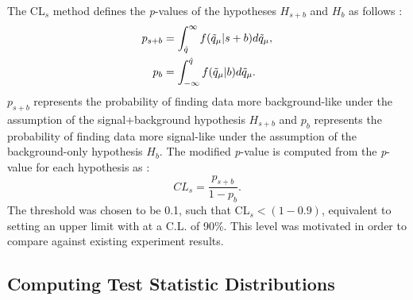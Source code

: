 The CL$_{s}$ method defines the \textit{p}-values of the hypotheses $H_{s+b}$ and $H_b$ as follows \cite{asymptotic_test, CLs_Junk, CLs_Read}:
\begin{align}
\label{eq:psb}
    p_{s+b} & = \int_{\hat{q}}^{\infty} f(\Tilde{q}_\mu|s+b) d\Tilde{q}_\mu, \\
\label{eq:pb}
    p_{b} & = \int^{\hat{q}}_{-\infty} f(\Tilde{q}_\mu|b) d\Tilde{q}_\mu.
\end{align}
$p_{s+b}$ represents the probability of finding data more background-like under the assumption of the signal+background hypothesis $H_{s+b}$ and $p_b$ represents the probability of finding data more signal-like under the assumption of the background-only hypothesis $H_b$.
The modified \textit{p}-value is computed from the \textit{p}-value for each hypothesis as \cite{asymptotic_test, CLs_Junk, CLs_Read}:
\begin{equation}
\label{eq:cls}
    CL_{s} = \frac{p_{s+b}}{1-p_b}.
\end{equation}
The threshold was chosen to be 0.1, such that CL$_{s} < (1 - 0.9)$, equivalent to setting an upper limit with at a C.L. of 90\%.
This level was motivated in order to compare against existing experiment results. 

\subsection{Computing Test Statistic Distributions}
\label{sec:compute_test}


